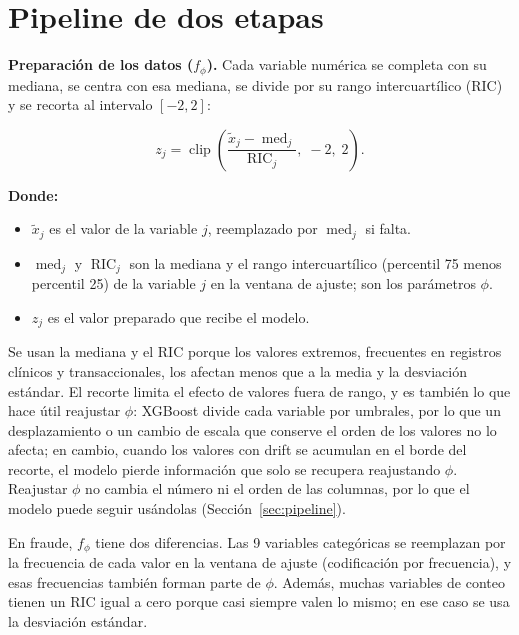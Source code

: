 \section{Pipeline de dos etapas}
\label{sec:met_pipeline}

\textbf{Preparación de los datos ($f_\phi$).} Cada variable numérica se completa con su mediana,
se centra con esa mediana, se divide por su rango intercuartílico (RIC) y se recorta al
intervalo $[-2, 2]$:

\begin{equation}
    z_j = \operatorname{clip}\!\left(\frac{\tilde{x}_j - \operatorname{med}_j}{\operatorname{RIC}_j},\; -2,\; 2\right).
    \label{eq:transformador}
\end{equation}

\noindent\textbf{Donde:}
\begin{itemize}
    \item $\tilde{x}_j$ es el valor de la variable $j$, reemplazado por $\operatorname{med}_j$ si falta.
    \item $\operatorname{med}_j$ y $\operatorname{RIC}_j$ son la mediana y el rango intercuartílico (percentil 75 menos percentil 25) de la variable $j$ en la ventana de ajuste; son los parámetros $\phi$.
    \item $z_j$ es el valor preparado que recibe el modelo.
\end{itemize}

Se usan la mediana y el RIC porque los valores extremos, frecuentes en registros clínicos y
transaccionales, los afectan menos que a la media y la desviación estándar. El recorte limita el
efecto de valores fuera de rango, y es también lo que hace útil reajustar $\phi$: XGBoost divide
cada variable por umbrales, por lo que un desplazamiento o un cambio de escala que conserve el
orden de los valores no lo afecta; en cambio, cuando los valores con drift se acumulan en el
borde del recorte, el modelo pierde información que solo se recupera reajustando $\phi$.
Reajustar $\phi$ no cambia el número ni el orden de las columnas, por lo que el modelo puede
seguir usándolas (Sección~\ref{sec:pipeline}).

En fraude, $f_\phi$ tiene dos diferencias. Las 9 variables categóricas se reemplazan por la
frecuencia de cada valor en la ventana de ajuste (codificación por frecuencia), y esas
frecuencias también forman parte de $\phi$. Además, muchas variables de conteo tienen un RIC
igual a cero porque casi siempre valen lo mismo; en ese caso se usa la desviación estándar.

